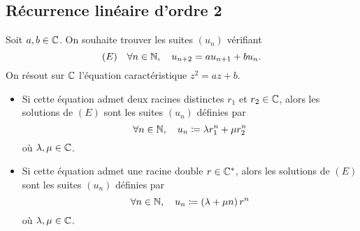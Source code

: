\documentclass{magnolia}
\begin{document}



\subsection{Récurrence linéaire d'ordre 2}
\begin{proposition}[utile=-3]
Soit $a,b\in\mathbb{C}$. On souhaite trouver les suites $(u_n)$ vérifiant
\[(E)\quad\forall n\in\mathbb{N} ,\quad u_{n+2}=au_{n+1}+b u_n.\]
On résout sur $\mathbb{C}$ l'équation caractéristique $z^2=az+b$.
\begin{itemize}
\item Si cette équation admet deux racines distinctes $r_1$ et $r_2\in\mathbb{C}$, alors
  les solutions de $(E)$ sont les suites $(u_n)$ définies par
  \[\forall n\in\mathbb{N} ,\quad u_n\coloneqq\lambda r_1^n +\mu r_2^n\]
  où $\lambda,\mu\in\mathbb{C}$.
\item Si cette équation admet une racine double $r\in\mathbb{C}^*$, alors 
  les solutions de $(E)$ sont les suites $(u_n)$ définies par
  \[\forall n\in\mathbb{N} ,\quad u_n\coloneqq\left(\lambda +\mu n\right)r^n\]
  où $\lambda,\mu\in\mathbb{C}$.
\end{itemize}
\end{proposition}
\end{document}
